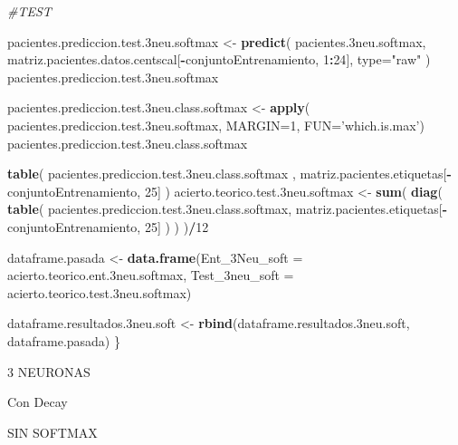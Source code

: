 \documentclass[]{article}
\newenvironment{Shaded}{\begin{snugshade}}{\end{snugshade}}
\newcommand{\KeywordTok}[1]{\textcolor[rgb]{0.13,0.29,0.53}{\textbf{#1}}}
\newcommand{\DataTypeTok}[1]{\textcolor[rgb]{0.13,0.29,0.53}{#1}}
\newcommand{\DecValTok}[1]{\textcolor[rgb]{0.00,0.00,0.81}{#1}}
\newcommand{\StringTok}[1]{\textcolor[rgb]{0.31,0.60,0.02}{#1}}
\newcommand{\CommentTok}[1]{\textcolor[rgb]{0.56,0.35,0.01}{\textit{#1}}}
\newcommand{\OperatorTok}[1]{\textcolor[rgb]{0.81,0.36,0.00}{\textbf{#1}}}
\newcommand{\NormalTok}[1]{#1}
\begin{document}
\begin{Shaded}
\begin{Highlighting}[]
  \CommentTok{#TEST}
  
\NormalTok{  pacientes.prediccion.test.3neu.softmax <-}\StringTok{ }\KeywordTok{predict}\NormalTok{( pacientes.3neu.softmax, matriz.pacientes.datos.centscal[}\OperatorTok{-}\NormalTok{conjuntoEntrenamiento, }\DecValTok{1}\OperatorTok{:}\DecValTok{24}\NormalTok{], }\DataTypeTok{type=}\StringTok{"raw"}\NormalTok{ )}
\NormalTok{  pacientes.prediccion.test.3neu.softmax}
  
\NormalTok{  pacientes.prediccion.test.3neu.class.softmax <-}\StringTok{ }\KeywordTok{apply}\NormalTok{( pacientes.prediccion.test.3neu.softmax, }\DataTypeTok{MARGIN=}\DecValTok{1}\NormalTok{, }\DataTypeTok{FUN=}\StringTok{'which.is.max'}\NormalTok{)}
\NormalTok{  pacientes.prediccion.test.3neu.class.softmax}
  
  \KeywordTok{table}\NormalTok{( pacientes.prediccion.test.3neu.class.softmax , matriz.pacientes.etiquetas[}\OperatorTok{-}\NormalTok{conjuntoEntrenamiento, }\DecValTok{25}\NormalTok{] )}
\NormalTok{  acierto.teorico.test.3neu.softmax <-}\StringTok{ }\KeywordTok{sum}\NormalTok{( }\KeywordTok{diag}\NormalTok{( }\KeywordTok{table}\NormalTok{( pacientes.prediccion.test.3neu.class.softmax, matriz.pacientes.etiquetas[}\OperatorTok{-}\NormalTok{conjuntoEntrenamiento, }\DecValTok{25}\NormalTok{] ) ) )}\OperatorTok{/}\DecValTok{12}
  
  
\NormalTok{  dataframe.pasada <-}\StringTok{ }\KeywordTok{data.frame}\NormalTok{(}\DataTypeTok{Ent_3Neu_soft =}\NormalTok{ acierto.teorico.ent.3neu.softmax,}
                                 \DataTypeTok{Test_3neu_soft =}\NormalTok{ acierto.teorico.test.3neu.softmax)}
  
\NormalTok{  dataframe.resultados.3neu.soft <-}\StringTok{ }\KeywordTok{rbind}\NormalTok{(dataframe.resultados.3neu.soft, dataframe.pasada)}
\NormalTok{\}}
\end{Highlighting}
\end{Shaded}

3 NEURONAS

Con Decay

SIN SOFTMAX
\end{document}

